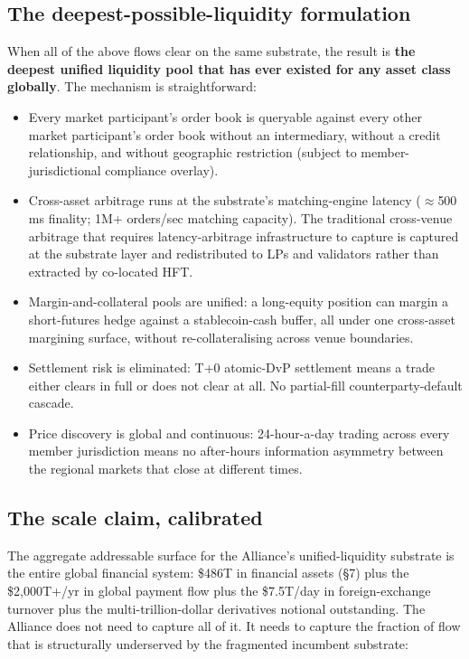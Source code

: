 \subsection{The deepest-possible-liquidity formulation}

When all of the above flows clear on the same substrate, the result is
\textbf{the deepest unified liquidity pool that has ever existed for
any asset class globally}. The mechanism is straightforward:

\begin{itemize}[leftmargin=2em,itemsep=0.1em]
\item Every market participant's order book is queryable against every
other market participant's order book without an intermediary, without
a credit relationship, and without geographic restriction (subject to
member-jurisdictional compliance overlay).
\item Cross-asset arbitrage runs at the substrate's matching-engine
latency ($\approx$500 ms finality; 1M+ orders/sec matching capacity).
The traditional cross-venue arbitrage that requires latency-arbitrage
infrastructure to capture is captured at the substrate layer and
redistributed to LPs and validators rather than extracted by
co-located HFT.
\item Margin-and-collateral pools are unified: a long-equity position
can margin a short-futures hedge against a stablecoin-cash buffer,
all under one cross-asset margining surface, without re-collateralising
across venue boundaries.
\item Settlement risk is eliminated: T+0 atomic-DvP settlement means a
trade either clears in full or does not clear at all. No partial-fill
counterparty-default cascade.
\item Price discovery is global and continuous: 24-hour-a-day trading
across every member jurisdiction means no after-hours information
asymmetry between the regional markets that close at different times.
\end{itemize}

\subsection{The scale claim, calibrated}

The aggregate addressable surface for the Alliance's unified-liquidity
substrate is the entire global financial system: \$486T in financial
assets (\S 7) plus the \$2,000T+/yr in global payment flow plus the
\$7.5T/day in foreign-exchange turnover plus the multi-trillion-dollar
derivatives notional outstanding. The Alliance does not need to capture
all of it. It needs to capture the fraction of flow that is structurally
underserved by the fragmented incumbent substrate:

